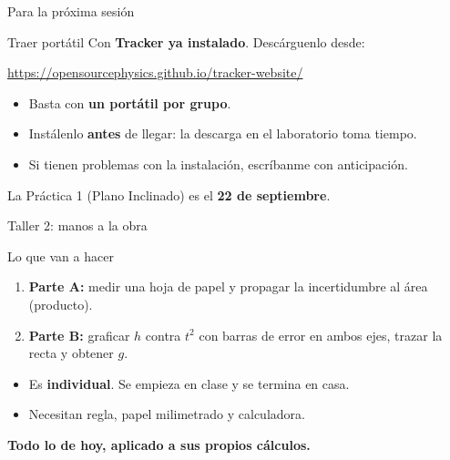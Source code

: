 \documentclass[aspectratio=169,xcolor=dvipsnames]{beamer}
\begin{document}
	\begin{frame}{Para la próxima sesión}
		\begin{alertblock}{Traer portátil}
			\centering
			Con \textbf{Tracker ya instalado}. Descárguenlo desde:
			\vspace{0.2cm}
			
			\url{https://opensourcephysics.github.io/tracker-website/}
		\end{alertblock}
		
		\vspace{0.4cm}
		\begin{itemize}
			\setlength{\itemsep}{6pt}
			\item Basta con \textbf{un portátil por grupo}.
			\item Instálenlo \textbf{antes} de llegar: la descarga en el laboratorio
			toma tiempo.
			\item Si tienen problemas con la instalación, escríbanme con anticipación.
		\end{itemize}
		
		\vspace{0.4cm}
		\begin{center}
			\small La Práctica 1 (Plano Inclinado) es el \textbf{22 de septiembre}.
		\end{center}
	\end{frame}
	
	\begin{frame}{Taller 2: manos a la obra}
		\begin{block}{Lo que van a hacer}
			\begin{enumerate}
				\item \textbf{Parte A:} medir una hoja de papel y propagar la
				incertidumbre al área (producto).
				\item \textbf{Parte B:} graficar $h$ contra $t^2$ con barras de error
				en ambos ejes, trazar la recta y obtener $g$.
			\end{enumerate}
		\end{block}
		
		\vspace{0.4cm}
		\begin{itemize}
			\item Es \textbf{individual}. Se empieza en clase y se termina en casa.
			\item Necesitan regla, papel milimetrado y calculadora.
		\end{itemize}
		
		\vspace{0.5cm}
		\begin{center}
			\large \textcolor{UnalGreen}{\textbf{Todo lo de hoy, aplicado a sus propios cálculos.}}
		\end{center}
	\end{frame}
	
\end{document}
